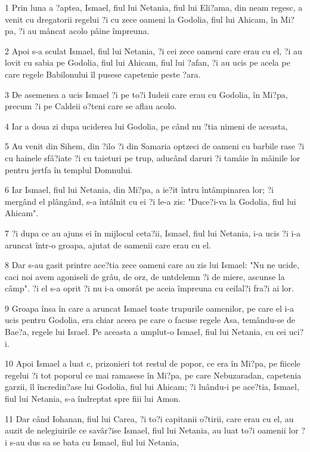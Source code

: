 \par 1 Prin luna a ?aptea, Ismael, fiul lui Netania, fiul lui Eli?ama, din neam regesc, a venit cu dregatorii regelui ?i cu zece oameni la Godolia, fiul lui Ahicam, în Mi?pa, ?i au mâncat acolo pâine împreuna.
\par 2 Apoi s-a sculat Ismael, fiul lui Netania, ?i cei zece oameni care erau cu el, ?i au lovit cu sabia pe Godolia, fiul lui Ahicam, fiul lui ?afan, ?i au ucis pe acela pe care regele Babilonului îl pusese capetenie peste ?ara.
\par 3 De asemenea a ucis Ismael ?i pe to?i Iudeii care erau cu Godolia, în Mi?pa, precum ?i pe Caldeii o?teni care se aflau acolo.
\par 4 Iar a doua zi dupa uciderea lui Godolia, pe când nu ?tia nimeni de aceasta,
\par 5 Au venit din Sihem, din ?ilo ?i din Samaria optzeci de oameni cu barbile rase ?i cu hainele sfâ?iate ?i cu taieturi pe trup, aducând daruri ?i tamâie în mâinile lor pentru jertfa în templul Domnului.
\par 6 Iar Ismael, fiul lui Netania, din Mi?pa, a ie?it întru întâmpinarea lor; ?i mergând el plângând, s-a întâlnit cu ei ?i le-a zis: "Duce?i-va la Godolia, fiul lui Ahicam".
\par 7 ?i dupa ce au ajuns ei în mijlocul ceta?ii, Ismael, fiul lui Netania, i-a ucis ?i i-a aruncat într-o groapa, ajutat de oamenii care erau cu el.
\par 8 Dar s-au gasit printre ace?tia zece oameni care au zis lui Ismael: "Nu ne ucide, caci noi avem agoniseli de grâu, de orz, de untdelemn ?i de miere, ascunse la câmp". ?i el s-a oprit ?i nu i-a omorât pe aceia împreuna cu ceilal?i fra?i ai lor.
\par 9 Groapa însa în care a aruncat Ismael toate trupurile oamenilor, pe care el i-a ucis pentru Godolia, era chiar aceea pe care o facuse regele Asa, temându-se de Bae?a, regele lui Israel. Pe aceasta a umplut-o Ismael, fiul lui Netania, cu cei uci?i.
\par 10 Apoi Ismael a luat c, prizonieri tot restul de popor, ce era în Mi?pa, pe fiicele regelui ?i tot poporul ce mai ramasese în Mi?pa, pe care Nebuzaradan, capetenia garzii, îl încredin?ase lui Godolia, fiul lui Ahicam; ?i luându-i pe ace?tia, Ismael, fiul lui Netania, s-a îndreptat spre fiii lui Amon.
\par 11 Dar când Iohanan, fiul lui Carea, ?i to?i capitanii o?tirii, care erau cu el, au auzit de nelegiuirile ce savâr?ise Ismael, fiul lui Netania, au luat to?i oamenii lor ?i s-au dus sa se bata cu Ismael, fiul lui Netania,
